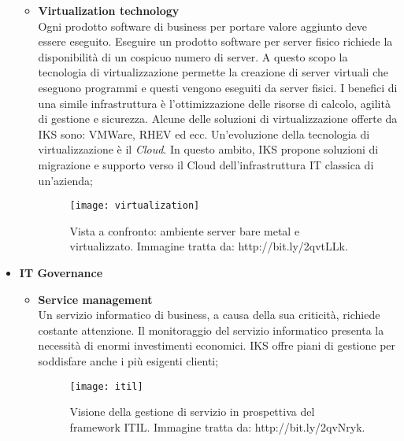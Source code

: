 \begin{itemize}
\begin{itemize}
		\item \textbf{Virtualization technology}\\
		 Ogni prodotto software di business per portare valore aggiunto 
		 deve essere eseguito. Eseguire un prodotto software per server 
		 fisico richiede la disponibilità di un cospicuo numero di server. 
		 A questo scopo la tecnologia di virtualizzazione permette la 
		 creazione di server virtuali che eseguono programmi e questi 
		 vengono eseguiti da server fisici. I benefici di una simile 
		 infrastruttura è l'ottimizzazione delle risorse di calcolo, 
		 agilità di gestione e sicurezza. Alcune delle soluzioni di 
		 virtualizzazione offerte da IKS sono: VMWare, RHEV ed ecc. 
		 Un'evoluzione della tecnologia di virtualizzazione è il \emph{Cloud}. 
		 In questo ambito, IKS propone soluzioni di migrazione e supporto 
		 verso il Cloud dell'infrastruttura IT classica di un'azienda;  
		 \begin{figure}[htbp]
			\begin{center}
				\texttt{[image: virtualization]}
				\caption{Vista a confronto: ambiente 
				server bare metal e virtualizzato. 
				Immagine tratta da: http://bit.ly/2qvtLLk.}
			\end{center}
		 \end{figure}
 	\end{itemize}

	\item \textbf{IT Governance}\\
	\begin{itemize}
		\item \textbf{Service management}\\
		Un servizio informatico di business, a causa della sua criticità,
		richiede costante attenzione. Il monitoraggio del servizio 
		informatico presenta la necessità di enormi investimenti 
		economici. IKS offre piani di gestione per soddisfare 
		anche i più esigenti clienti;
	    
	    \begin{figure}[htbp]
	    	\begin{center}
	    		\texttt{[image: itil]}
	    		\caption{Visione della gestione di servizio in 
				prospettiva del \gls{framework} ITIL. Immagine tratta da: 
				http://bit.ly/2qvNryk.}
	    	\end{center}
	    \end{figure}
	    

\end{itemize}
\end{itemize}
